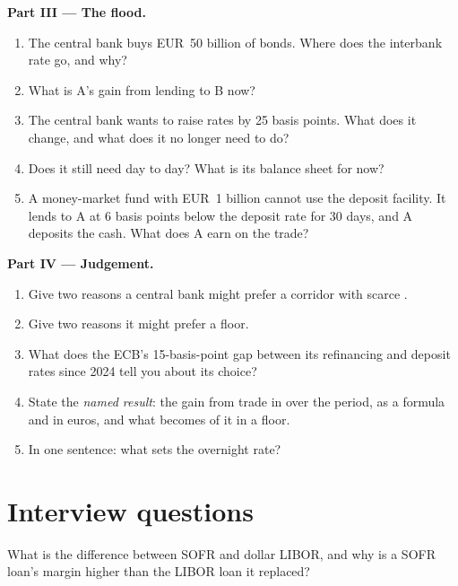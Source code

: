 \begin{problem}
\medskip\noindent\textbf{Part III --- The flood.}
\begin{enumerate}[resume]
\item The central bank buys EUR~50 billion of bonds. Where does the
interbank rate go, and why?
\item What is A's gain from lending to B now?
\item The central bank wants to raise rates by 25 basis points. What does it
change, and what does it no longer need to do?
\item Does it still need  day to day? What is its
balance sheet for now?
\item A money-market fund with EUR~1 billion cannot use the deposit
facility. It lends to A at 6 basis points below the deposit rate for 30
days, and A deposits the cash. What does A earn on the trade?
\end{enumerate}

\medskip\noindent\textbf{Part IV --- Judgement.}
\begin{enumerate}[resume]
\item Give two reasons a central bank might prefer a corridor with scarce
.
\item Give two reasons it might prefer a floor.
\item What does the ECB's 15-basis-point gap between its refinancing and
deposit rates since 2024 tell you about its choice?
\item State the \emph{named result}: the gain from trade in  over the
period, as a formula and in euros, and what becomes of it in a floor.
\item In one sentence: what sets the overnight rate?
\end{enumerate}
\end{problem}

\section{Interview questions}

\begin{interviewq}\label{iq:m2:central-banks-and-the-short-rate:1}
What is the difference between SOFR and dollar LIBOR, and why is a SOFR
loan's margin higher than the LIBOR loan it replaced?
\end{interviewq}

